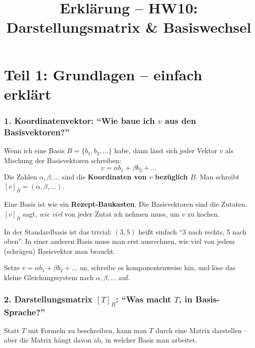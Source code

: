 \documentclass[a4paper,12pt]{article}
\title{Erkl\"arung -- HW10: Darstellungsmatrix \& Basiswechsel}
\author{}
\date{}
\begin{document}
\maketitle

\part*{Teil 1: Grundlagen -- einfach erkl\"art}

\section*{1. Koordinatenvektor: ``Wie baue ich $v$ aus den Basisvektoren?''}

Wenn ich eine Basis $B = \{b_1, b_2, \dots\}$ habe, dann l\"asst sich jeder Vektor $v$ als Mischung der Basisvektoren schreiben:
\[
v = \alpha b_1 + \beta b_2 + \dots
\]
Die Zahlen $\alpha, \beta, \dots$ sind die \textbf{Koordinaten von $v$ bez\"uglich $B$}. Man schreibt $[v]_B = (\alpha, \beta, \dots)$.

\begin{analogie}
Eine Basis ist wie ein \textbf{Rezept-Baukasten}. Die Basisvektoren sind die Zutaten. $[v]_B$ sagt, \emph{wie viel} von jeder Zutat ich nehmen muss, um $v$ zu kochen.

In der Standardbasis ist das trivial: $(3, 5)$ hei\ss t einfach ``3 nach rechts, 5 nach oben''. In einer anderen Basis muss man erst ausrechnen, wie viel von jedem (schr\"agen) Basisvektor man braucht.
\end{analogie}

\begin{merkbox}[title={So rechnet man $[v]_B$ aus}]
Setze $v = \alpha b_1 + \beta b_2 + \dots$ an, schreibe es komponentenweise hin, und l\"ose das kleine Gleichungssystem nach $\alpha, \beta, \dots$ auf.
\end{merkbox}

\section*{2. Darstellungsmatrix $[T]_B$: ``Was macht $T$, in Basis-Sprache?''}

Statt $T$ mit Formeln zu beschreiben, kann man $T$ durch eine Matrix darstellen -- aber die Matrix h\"angt davon ab, in welcher Basis man arbeitet.
\end{document}
